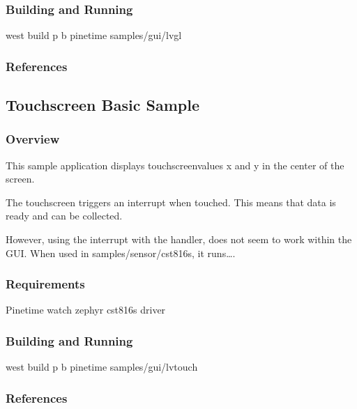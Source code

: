 \documentclass[letterpaper,10pt,english]{sphinxmanual}
\begin{document}
\subsubsection{Building and Running}
\label{\detokenize{samples/gui/lvgl/README:building-and-running}}
west build \sphinxhyphen{}p \sphinxhyphen{}b pinetime samples/gui/lvgl


\subsubsection{References}
\label{\detokenize{samples/gui/lvgl/README:references}}

\subsection{Touchscreen Basic Sample}
\label{\detokenize{samples/gui/lvtouch/README:touchscreen-basic-sample}}\label{\detokenize{samples/gui/lvtouch/README:touchscreen-sample}}\label{\detokenize{samples/gui/lvtouch/README::doc}}

\subsubsection{Overview}
\label{\detokenize{samples/gui/lvtouch/README:overview}}
This sample application displays touchscreen\sphinxhyphen{}values x and y in the center of the screen.

The touchscreen triggers an interrupt when touched.
This means that data is ready and can be collected.

However, using the interrupt with the handler, does not seem to work within the GUI.
When used in samples/sensor/cst816s, it runs….


\subsubsection{Requirements}
\label{\detokenize{samples/gui/lvtouch/README:requirements}}
Pinetime watch
zephyr cst816s driver


\subsubsection{Building and Running}
\label{\detokenize{samples/gui/lvtouch/README:building-and-running}}
west build \sphinxhyphen{}p \sphinxhyphen{}b pinetime samples/gui/lvtouch


\subsubsection{References}
\label{\detokenize{samples/gui/lvtouch/README:references}}
\end{document}
